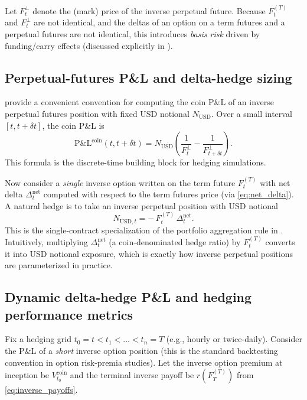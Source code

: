 \documentclass[a4paper,titlepage,12pt]{report}
\theoremstyle{plain}
\begin{document}
Let $F_t^{\perp}$ denote the (mark) price of the inverse perpetual future. Because $F_t^{(T)}$ and $F_t^{\perp}$ are not identical, and the deltas of an option on a term futures and a perpetual futures are not identical, this introduces \emph{basis risk} driven by funding/carry effects (discussed explicitly in \citet{LucicSepp2024}).

\subsection{Perpetual-futures P\&L and delta-hedge sizing}
\label{subsec:perp_pnl}

\citet{LucicSepp2024} provide a convenient convention for computing the coin P\&L of an inverse perpetual futures position with fixed USD notional $N_{\mathrm{USD}}$. Over a small interval $[t,t+\delta t]$, the coin P\&L is
\begin{equation}
\mathrm{P\&L}^{\mathrm{coin}}(t,t+\delta t)
=
N_{\mathrm{USD}}
\left(
\frac{1}{F_t^{\perp}}-\frac{1}{F_{t+\delta t}^{\perp}}
\right).
\label{eq:perp_pnl_coin}
\end{equation}
This formula is the discrete-time building block for hedging simulations.

Now consider a \emph{single} inverse option written on the term future $F_t^{(T)}$ with net delta $\Delta_t^{\mathrm{net}}$ computed with respect to the term futures price (via \eqref{eq:net_delta}). A natural hedge is to take an inverse perpetual position with USD notional
\begin{equation}
\boxed{
N_{\mathrm{USD},t}
=
-\,F_t^{(T)}\,\Delta_t^{\mathrm{net}}.}
\label{eq:hedge_notional}
\end{equation}
This is the single-contract specialization of the portfolio aggregation rule in \citet{LucicSepp2024}. Intuitively, multiplying $\Delta_t^{\mathrm{net}}$ (a coin-denominated hedge ratio) by $F_t^{(T)}$ converts it into USD notional exposure, which is exactly how inverse perpetual positions are parameterized in practice.

\subsection{Dynamic delta-hedge P\&L and hedging performance metrics}
\label{subsec:hedging_performance}

Fix a hedging grid $t_0=t < t_1 < \dots < t_n=T$ (e.g., hourly or twice-daily). Consider the P\&L of a \emph{short} inverse option position (this is the standard backtesting convention in option risk-premia studies). Let the inverse option premium at inception be $V_{t_0}^{\mathrm{coin}}$ and the terminal inverse payoff be $r(F_T^{(T)})$ from \eqref{eq:inverse_payoffs}.
\end{document}
